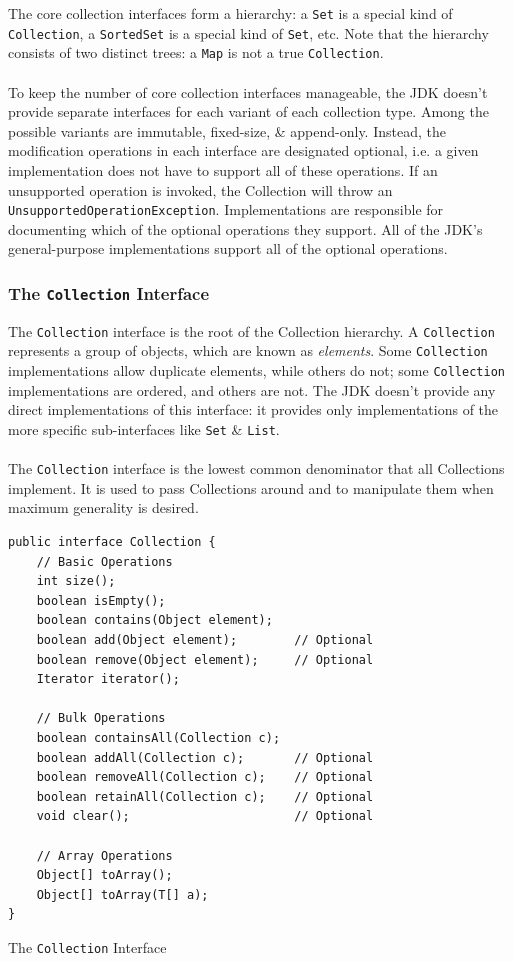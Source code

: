 \documentclass[a4paper,11pt]{article}
\newenvironment{code}{\captionsetup{type=listing}}{}
\begin{document}
The core collection interfaces form a hierarchy: a \verb|Set| is a special kind of \verb|Collection|, a \verb|SortedSet| is a special kind of \verb|Set|, etc.
Note that the hierarchy consists of two distinct trees: a \verb|Map| is not a true \verb|Collection|.
\\\\
To keep the number of core collection interfaces manageable, the JDK doesn't provide separate interfaces for each variant of each collection type.
Among the possible variants are immutable, fixed-size, \& append-only.
Instead, the modification operations in each interface are designated optional, i.e. a given implementation does not have to support all of these operations.
If an unsupported operation is invoked, the Collection will throw an \verb|UnsupportedOperationException|.
Implementations are responsible for documenting which of the optional operations they support. 
All of the JDK's general-purpose implementations support all of the optional operations.

\subsubsection{The \texttt{Collection} Interface}
The \verb|Collection| interface is the root of the Collection hierarchy.
A \verb|Collection| represents a group of objects, which are known as \emph{elements}.
Some \verb|Collection| implementations allow duplicate elements, while others do not; some \verb|Collection| implementations are ordered, and others are not.
The JDK doesn't provide any direct implementations of this interface: it provides only implementations of the more specific sub-interfaces like \verb|Set| \& 
\verb|List|.
\\\\
The \verb|Collection| interface is the lowest common denominator that all Collections implement.
It is used to pass Collections around and to manipulate them when maximum generality is desired.

\begin{code}
\begin{verbatim}
public interface Collection {
    // Basic Operations
    int size();
    boolean isEmpty();
    boolean contains(Object element);
    boolean add(Object element);        // Optional
    boolean remove(Object element);     // Optional
    Iterator iterator();

    // Bulk Operations
    boolean containsAll(Collection c);
    boolean addAll(Collection c);       // Optional
    boolean removeAll(Collection c);    // Optional
    boolean retainAll(Collection c);    // Optional
    void clear();                       // Optional        

    // Array Operations
    Object[] toArray();
    Object[] toArray(T[] a);
}
\end{verbatim}
\caption{The \texttt{Collection} Interface}
\end{code}
\end{document}
